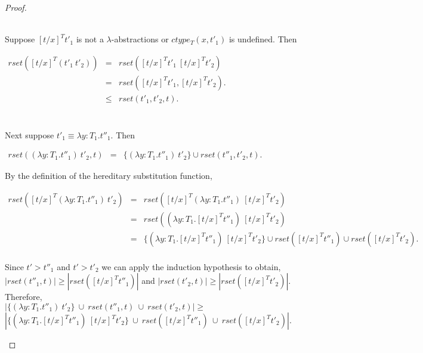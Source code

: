 \begin{proof}
\begin{itemize}
  \ \\
  \noindent
  Suppose $[t/x]^T t'_1$ is not a $\lambda$-abstractions or $ctype_T(x,t'_1)$ is undefined.  Then
  \begin{center}
    \begin{math}
      \begin{array}{lll}
        rset([t/x]^T (t'_1\ t'_2)) & = & rset([t/x]^T t'_1\ [t/x]^T t'_2)\\
        & = & rset([t/x]^T t'_1, [t/x]^T t'_2).\\
        & \leq & rset(t'_1, t'_2, t).\\
      \end{array}
    \end{math}
  \end{center}
  
  \ \\
  Next suppose $t'_1 \equiv \lambda y:T_1.t''_1$.  Then 
  \begin{center}
    \begin{math}
      \begin{array}{lll}
        rset((\lambda y:T_1.t''_1)\ t'_2, t) & = & \{ (\lambda y:T_1.t''_1)\ t'_2\} \cup rset(t''_1, t'_2, t).
      \end{array}
    \end{math}
  \end{center}
  By the definition of the hereditary substitution function,
  \begin{center}
    \begin{math}
      \begin{array}{lll}
        rset([t/x]^T (\lambda y:T_1.t''_1)\ t'_2) & = & rset([t/x]^T (\lambda y:T_1.t''_1)\ [t/x]^T t'_2)\\
        & = & rset((\lambda y:T_1.[t/x]^T t''_1)\ [t/x]^T t'_2)\\
        & = & \{(\lambda y:T_1.[t/x]^T t''_1)\ [t/x]^T t'_2\} \cup 
        rset([t/x]^T t''_1) \cup rset([t/x]^T t'_2).\\
        
      \end{array}
    \end{math}
  \end{center}
  Since $t' > t''_1$ and $t' > t'_2$ we can apply the induction hypothesis to obtain,
  $|rset(t''_1, t)| \geq |rset([t/x]^T t''_1)|$ and $|rset(t'_2,t)| \geq |rset([t/x]^T t'_2)|$.  Therefore, \\
  $|\{ (\lambda y:T_1.t''_1)\ t'_2\}\ \cup\ rset(t''_1,t)\ \cup\ rset(t'_2,t)| \geq $ 
  $|\{(\lambda y:T_1.[t/x]^T t''_1)\ [t/x]^T t'_2\}\ \cup\ rset([t/x]^T t''_1)\ \cup\ rset([t/x]^T t'_2)|$.
\end{itemize}
\end{proof}


